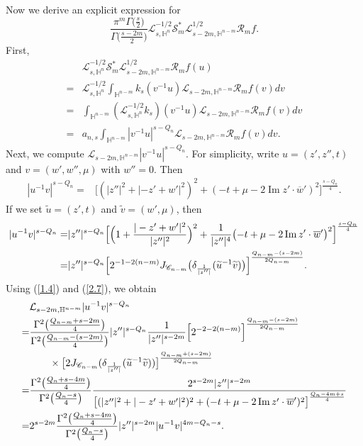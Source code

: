 \documentclass[12pt,reqno]{amsart}%
\theoremstyle{plain}
\numberwithin{equation}{section}
\begin{document}
Now  we derive an explicit expression for
\[
\frac{\pi^{m}\Gamma\bigl(\frac{s}{2}\bigr)}{\Gamma\bigl(\frac{s-2m}{2}\bigr)}
\mathcal{L}_{s,\mathbb{H}^{n}}^{-1/2}\mathcal{S}_{m}^{\ast}\mathcal{L}_{s-2m,\mathbb{H}^{n-m}}^{1/2}\mathcal{R}_{m}f.
\]
First,
\begin{align}\nonumber
&\mathcal{L}_{s,\mathbb{H}^{n}}^{-1/2}\mathcal{S}_{m}^{\ast}\mathcal{L}_{s-2m,\mathbb{H}^{n-m}}^{1/2}\mathcal{R}_{m}f(u) \\
\nonumber
=& \mathcal{L}_{s,\mathbb{H}^{n}}^{-1/2}\int_{\mathbb{H}^{n-m}}k_s(v^{-1}u)
\mathcal{L}_{s-2m,\mathbb{H}^{n-m}}\mathcal{R}_{m}f(v)dv \\
\nonumber
=& \int_{\mathbb{H}^{n-m}}(\mathcal{L}_{s,\mathbb{H}^{n}}^{-1/2}k_s)(v^{-1}u)
\mathcal{L}_{s-2m,\mathbb{H}^{n-m}}\mathcal{R}_{m}f(v)dv \\
\label{4.2}
=& a_{n,s}\int_{\mathbb{H}^{n-m}}|v^{-1}u|^{s-Q_n}
\mathcal{L}_{s-2m,\mathbb{H}^{n-m}}\mathcal{R}_{m}f(v)dv .
\end{align}
Next,  we compute \(\mathcal{L}_{s-2m,\mathbb{H}^{n-m}}|v^{-1}u|^{s-Q_n}\).
For simplicity, write \(u=(z',z'',t)\) and \(v=(w',w'',\mu)\) with \(w''=0\). Then
\begin{align*}
|u^{-1}v|^{s-Q_n} =& \bigl[(|z''|^{2}+|-z'+w'|^{2})^{2}+(-t+\mu-2\operatorname{Im} z' \cdot \overline{w}')^{2}\bigr]^{\frac{s-Q_n}{4}} .
\end{align*}
If we set \(\widetilde{u}=(z',t)\) and \(\widetilde{v}=(w',\mu)\), then
\begin{align*}
|u^{-1}v|^{s-Q_n}
=& |z''|^{s-Q_n}
\Bigl[\Bigl(1+\frac{|-z'+w'|^{2}}{|z''|^{2}}\Bigr)^{2}
+ \frac{1}{|z''|^{4}}\bigl(-t+\mu-2\operatorname{Im} z' \cdot \overline{w}'\bigr)^{2}\Bigr]^{\frac{s-Q_n}{4}} \\
=& |z''|^{s-Q_n}
\Bigl[2^{-1-2(n-m)}J_{\mathscr{C}_{n-m}}\bigl(\delta_{\frac{1}{|z''|}}(\widetilde{u}^{-1}\widetilde{v})\bigr)\Bigr]
^{\frac{Q_{n-m}-(s-2m)}{2Q_{n-m}}} .
\end{align*}
Using (\ref{1.4}) and (\ref{2.7}), we obtain
\begin{align}\nonumber
&\mathcal{L}_{s-2m,\mathbb{H}^{n-m}}|u^{-1}v|^{s-Q_n} \\
\nonumber
=& \frac{\Gamma^{2}\bigl(\frac{Q_{n-m}+s-2m}{4}\bigr)}
{\Gamma^{2}\bigl(\frac{Q_{n-m}-(s-2m)}{4}\bigr)}
|z''|^{s-Q_n}\frac{1}{|z''|^{s-2m}}
\Bigl[2^{-2-2(n-m)}\Bigr]^{\frac{Q_{n-m}-(s-2m)}{2Q_{n-m}}}\\
\nonumber
&\qquad \times \bigl[2J_{\mathscr{C}_{n-m}}(\delta_{\frac{1}{|z''|}}(\widetilde{u}^{-1}\widetilde{v}))\bigr]^{\frac{Q_{n-m}+(s-2m)}{2Q_{n-m}}}\\
\nonumber
=& \frac{\Gamma^{2}\bigl(\frac{Q_{n}+s-4m}{4}\bigr)}
{\Gamma^{2}\bigl(\frac{Q_{n}-s}{4}\bigr)}
\frac{2^{s-2m}|z''|^{s-2m}}
{\bigl[(|z''|^{2}+|-z'+w'|^{2})^{2}+(-t+\mu-2\operatorname{Im} z' \cdot \overline{w}')^{2}\bigr]^{\frac{Q_n-4m+s}{4}}}\\
\label{3.5}
=& 2^{s-2m}\frac{\Gamma^{2}\bigl(\frac{Q_{n}+s-4m}{4}\bigr)}
{\Gamma^{2}\bigl(\frac{Q_{n}-s}{4}\bigr)}
|z''|^{s-2m}|u^{-1}v|^{4m-Q_n-s}.
\end{align}
\end{document}

